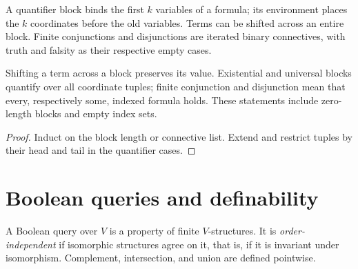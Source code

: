 \begin{definition}
  \label{def:desc-fo-blocks}
  \leanok
  A quantifier block binds the first $k$ variables of a formula; its environment
  places the $k$ coordinates before the old variables. Terms can be shifted
  across an entire block. Finite conjunctions and disjunctions are iterated
  binary connectives, with truth and falsity as their respective empty cases.
\end{definition}

\begin{theorem}
  \label{thm:desc-fo-blocks}
  \leanok
  Shifting a term across a block preserves its value. Existential and universal
  blocks quantify over all coordinate tuples; finite conjunction and disjunction
  mean that every, respectively some, indexed formula holds. These statements
  include zero-length blocks and empty index sets.
\end{theorem}
\begin{proof}
  \leanok
  Induct on the block length or connective list. Extend and restrict tuples by
  their head and tail in the quantifier cases.
\end{proof}

\section{Boolean queries and definability}

\begin{definition}
  \label{def:desc-query}
  \leanok
  A Boolean query over $V$ is a property of finite $V$-structures. It is
  \emph{order-independent} if isomorphic structures agree on it, that is, if it
  is invariant under isomorphism. Complement, intersection, and union are defined
  pointwise.
\end{definition}


